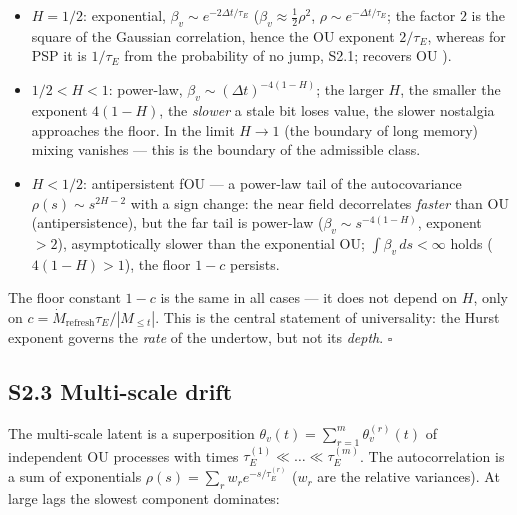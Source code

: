 \documentclass[12pt]{iopart}
\providecommand{\tightlist}{\setlength{\itemsep}{0pt}\setlength{\parskip}{0pt}}
\begin{document}
\begin{itemize}

\tightlist

\item

  \(H = 1/2\): exponential, \(\beta_v \sim e^{-2\Delta t/\tau_E}\) (\(\beta_v \approx \tfrac12\rho^2\), \(\rho \sim e^{-\Delta t/\tau_E}\); the factor \(2\) is the square of the Gaussian correlation, hence the OU exponent \(2/\tau_E\), whereas for PSP it is \(1/\tau_E\) from the probability of no jump, S2.1; recovers OU \cite{Andriishin2026b}).

\item

  \(1/2 < H < 1\): power-law, \(\beta_v \sim (\Delta t)^{-4(1-H)}\); the larger \(H\), the smaller the exponent \(4(1-H)\), the \emph{slower} a stale bit loses value, the slower nostalgia approaches the floor. In the limit \(H \to 1\) (the boundary of long memory) mixing vanishes --- this is the boundary of the admissible class.

\item

  \(H < 1/2\): antipersistent fOU --- a power-law tail of the autocovariance \(\rho(s) \sim s^{2H-2}\) with a sign change: the near field decorrelates \emph{faster} than OU (antipersistence), but the far tail is power-law (\(\beta_v \sim s^{-4(1-H)}\), exponent \(> 2\)), asymptotically slower than the exponential OU; \(\int\beta_v\,ds < \infty\) holds (\(4(1-H) > 1\)), the floor \(1-c\) persists.

\end{itemize}



The floor constant \(1-c\) is the same in all cases --- it does not depend on \(H\), only on \(c = \dot M_{\text{refresh}}\tau_E/|M_{\le t}|\). This is the central statement of universality: the Hurst exponent governs the \emph{rate} of the undertow, but not its \emph{depth}. \(\square\)



\subsection{S2.3 Multi-scale drift}\label{s2.3-multi-scale-drift}



The multi-scale latent is a superposition \(\theta_v(t) = \sum_{r=1}^m \theta_v^{(r)}(t)\) of independent OU processes with times \(\tau_E^{(1)} \ll \dots \ll \tau_E^{(m)}\). The autocorrelation is a sum of exponentials \(\rho(s) = \sum_r w_r e^{-s/\tau_E^{(r)}}\) (\(w_r\) are the relative variances). At large lags the slowest component dominates:
\end{document}

